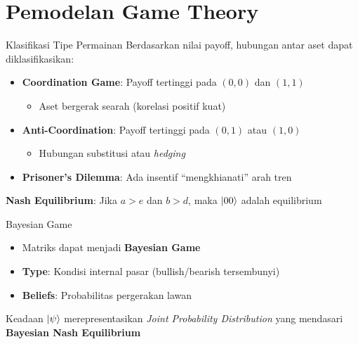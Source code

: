 \documentclass[aspectratio=169]{beamer}
\begin{document}
\section{Pemodelan Game Theory}

\begin{frame}{Klasifikasi Tipe Permainan}
    Berdasarkan nilai payoff, hubungan antar aset dapat diklasifikasikan:
    
    \begin{itemize}
        \item \textbf{Coordination Game}: Payoff tertinggi pada $(0,0)$ dan $(1,1)$
            \begin{itemize}
                \item Aset bergerak searah (korelasi positif kuat)
            \end{itemize}
        \item \textbf{Anti-Coordination}: Payoff tertinggi pada $(0,1)$ atau $(1,0)$
            \begin{itemize}
                \item Hubungan substitusi atau \textit{hedging}
            \end{itemize}
        \item \textbf{Prisoner's Dilemma}: Ada insentif ``mengkhianati'' arah tren
    \end{itemize}
    
    \vspace{0.5cm}
    \textbf{Nash Equilibrium}: Jika $a > e$ dan $b > d$, maka $\ket{00}$ adalah equilibrium
\end{frame}

\begin{frame}{Bayesian Game}
    \begin{itemize}
        \item Matriks dapat menjadi \textbf{Bayesian Game}
        \item \textbf{Type}: Kondisi internal pasar (bullish/bearish tersembunyi)
        \item \textbf{Beliefs}: Probabilitas pergerakan lawan
    \end{itemize}
    
    \vspace{0.5cm}
    
    Keadaan $\ket{\psi}$ merepresentasikan \textit{Joint Probability Distribution} yang mendasari \textbf{Bayesian Nash Equilibrium}
\end{frame}
\end{document}
